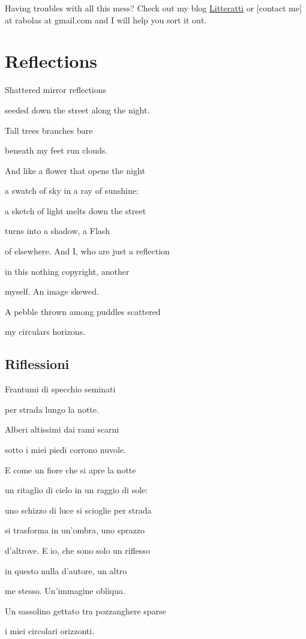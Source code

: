 \documentclass[]{book}
\begin{document}
Having troubles with all this mess? Check out my blog
\href{http://litteratti.wordpress.com/}{Litteratti} or {[}contact me{]}
at rabolas at gmail.com and I will help you sort it out.

\chapter{Reflections}\label{reflections}

Shattered mirror reflections

seeded down the street along the night.

Tall trees branches bare

beneath my feet run clouds.

And like a flower that opens the night

a swatch of sky in a ray of sunshine:

a sketch of light melts down the street

turns into a shadow, a Flash

of elsewhere. And I, who are just a reflection

in this nothing copyright, another

myself. An image skewed.

A pebble thrown among puddles scattered

my circulars horizons.

\section*{Riflessioni}\label{riflessioni}

Frantumi di specchio seminati

per strada lungo la notte.

Alberi altissimi dai rami scarni

sotto i miei piedi corrono nuvole.

E come un fiore che si apre la notte

un ritaglio di cielo in un raggio di sole:

uno schizzo di luce si scioglie per strada

si trasforma in un'ombra, uno sprazzo

d'altrove. E io, che sono solo un riflesso

in questo nulla d'autore, un altro

me stesso. Un'immagine obliqua.

Un sassolino gettato tra pozzanghere sparse

i miei circolari orizzonti.
\end{document}
